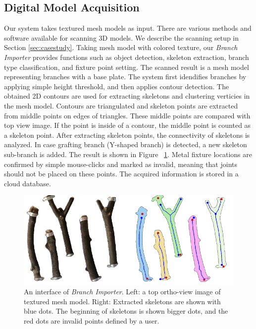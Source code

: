 \subsection{Digital Model Acquisition}
Our system takes textured mesh models as input.
There are various methods and software available for scanning 3D models.
We describe the scanning setup in Section \ref{sec:casestudy}.
Taking mesh model with colored texture, our \textit{Branch Importer} provides functions such as object detection, skeleton extraction, branch type classification, and fixture point setting.
The scanned result is a mesh model representing branches with a base plate.
The system first idendifies branches by applying simple height threshold, and then applies contour detection.
The obtained 2D contours are used for extracting skeletons and clustering verticies in the mesh model.
Contours are triangulated and skeleton points are extracted from middle points on edges of triangles.
These middle points are compared with top view image.
If the point is inside of a contour, the middle point is counted as a skeleton point.
After extracting skeleton points, the connectivity of skeletons is analyzed.
In case grafting branch (Y-shaped branch) is detected, a new skeleton sub-branch is added.
The result is shown in Figure ~\ref{fig:skeleton}.
Metal fixture locations are confirmed by simple mouse-clicks and marked as invalid, meaning that joints should not be placed on these points.
The acquired information is stored in a cloud database.

\begin{figure}[ht]
  \includegraphics[width = 0.4\paperwidth]{images/importer/importer.png}
  \caption{An interface of \textit{Branch Importer}. Left: a top ortho-view image of textured mesh model. Right: Extracted skeletons are shown with blue dots. The beginning of skeletons is shown bigger dots, and the red dots are invalid points defined by a user. }
  \label{fig:skeleton}
\end{figure}


